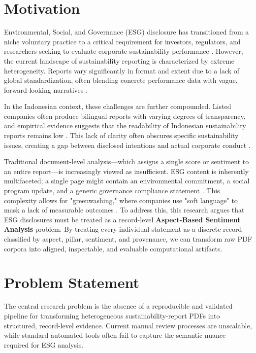 
\section{Motivation}

Environmental, Social, and Governance (ESG) disclosure has transitioned from a niche voluntary practice to a critical requirement for investors, regulators, and researchers seeking to evaluate corporate sustainability performance  \parencite{hans_bonde_christensen_45b44695}. However, the current landscape of sustainability reporting is characterized by extreme heterogeneity. Reports vary significantly in format and extent due to a lack of global standardization, often blending concrete performance data with vague, forward-looking narratives  \parencite{habiba_al_shaer_c2f5394b}.

In the Indonesian context, these challenges are further compounded. Listed companies often produce bilingual reports with varying degrees of transparency, and empirical evidence suggests that the readability of Indonesian sustainability reports remains low  \parencite{desi_adhariani_543335d6}. This lack of clarity often obscures specific sustainability issues, creating a gap between disclosed intentions and actual corporate conduct  \parencite{marsdenia_010e13e7}.

Traditional document-level analysis—which assigns a single score or sentiment to an entire report—is increasingly viewed as insufficient. ESG content is inherently multifaceted; a single page might contain an environmental commitment, a social program update, and a generic governance compliance statement  \parencite{keane_ong_0a5de439}. This complexity allows for "greenwashing," where companies use "soft language" to mask a lack of measurable outcomes  \parencite{keane_ong_8fec4760}. To address this, this research argues that ESG disclosures must be treated as a record-level \textbf{Aspect-Based Sentiment Analysis} problem. By treating every individual statement as a discrete record classified by aspect, pillar, sentiment, and provenance, we can transform raw PDF corpora into aligned, inspectable, and evaluable computational artifacts.
\section{Problem Statement}

The central research problem is the absence of a reproducible and validated pipeline for transforming heterogeneous sustainability-report PDFs into structured, record-level evidence. Current manual review processes are unscalable, while standard automated tools often fail to capture the semantic nuance required for ESG analysis.

